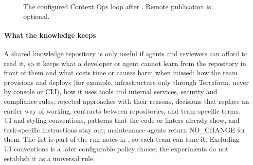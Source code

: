 \begin{figure}[htbp]
\centering
{}
\caption{The configured Context Ops loop after . Remote publication is optional.}
\label{fig:loop}
\end{figure}

\paragraph{What the knowledge keeps}
\label{sec:admission}
A shared knowledge repository is only useful if agents and reviewers can afford to read it, so it keeps what a developer or agent cannot learn from the repository in front of them and what costs time or causes harm when missed: how the team provisions and deploys (for example, infrastructure only through Terraform, never by console or CLI), how it uses tools and internal services, security and compliance rules, rejected approaches with their reasons, decisions that replace an earlier way of working, contracts between repositories, and team-specific terms. UI and styling conventions, patterns that the code or linters already show, and task-specific instructions stay out; maintenance agents return NO\_CHANGE for them. The list is part of the run notes in , so each team can tune it. Excluding UI conventions is a later configurable policy choice; the experiments do not establish it as a universal rule.

